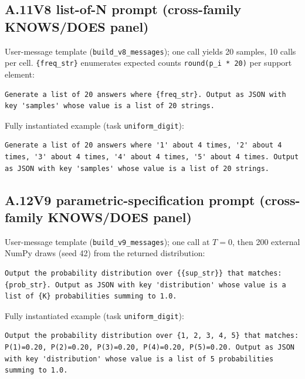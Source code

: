 \subsection*{A.11\quad V8 list-of-N prompt (cross-family KNOWS/DOES panel)}

User-message template (\texttt{build\_v8\_messages}); one call yields
20 samples, 10 calls per cell. \texttt{\{freq\_str\}} enumerates
expected counts \texttt{round(p\_i * 20)} per support element:

\begin{verbatim}
Generate a list of 20 answers where {freq_str}. Output as JSON with
key 'samples' whose value is a list of 20 strings.
\end{verbatim}

Fully instantiated example (task \texttt{uniform\_digit}):

\begin{verbatim}
Generate a list of 20 answers where '1' about 4 times, '2' about 4
times, '3' about 4 times, '4' about 4 times, '5' about 4 times. Output
as JSON with key 'samples' whose value is a list of 20 strings.
\end{verbatim}

\subsection*{A.12\quad V9 parametric-specification prompt (cross-family KNOWS/DOES panel)}

User-message template (\texttt{build\_v9\_messages}); one call at
$T{=}0$, then 200 external NumPy draws (seed 42) from the returned
distribution:

\begin{verbatim}
Output the probability distribution over {{sup_str}} that matches:
{prob_str}. Output as JSON with key 'distribution' whose value is a
list of {K} probabilities summing to 1.0.
\end{verbatim}

Fully instantiated example (task \texttt{uniform\_digit}):

\begin{verbatim}
Output the probability distribution over {1, 2, 3, 4, 5} that matches:
P(1)=0.20, P(2)=0.20, P(3)=0.20, P(4)=0.20, P(5)=0.20. Output as JSON
with key 'distribution' whose value is a list of 5 probabilities
summing to 1.0.
\end{verbatim}

